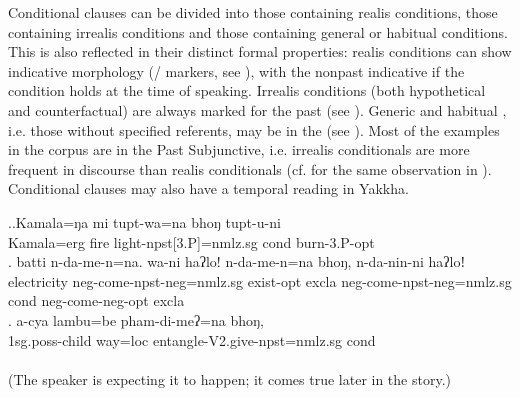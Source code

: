 Conditional clauses can be divided into those containing realis conditions, those containing irrealis conditions and those containing general or habitual conditions. This is also reflected in their  distinct formal properties: realis conditions can show indicative morphology (/ markers, see \Next), with the nonpast indicative if the condition holds at the time of speaking. Irrealis conditions (both hypothetical and counterfactual) are always marked for the past (see \NNext). Generic and habitual , i.e. those without specified referents, may be in the  (see \NNext[c]). Most of the examples in the  corpus are in the Past Subjunctive, i.e. irrealis conditionals are more frequent in discourse than realis conditionals (cf. \citet[463]{Genetti2007_Newari} for the same observation in ). Conditional clauses may also have a temporal reading in Yakkha. 


	\ex.\ag.Kamala=ŋa mi tupt-wa=na bhoŋ tupt-u-ni \\
	Kamala{\sc =erg} fire   light{\sc -npst[3.P]=nmlz.sg} {\sc cond} burn{\sc -3.P-opt}\\
	\bg.	batti n-da-me-n=na. wa-ni haʔlo! n-da-me-n=na bhoŋ, n-da-nin-ni haʔloǃ\\
	electricity   {\sc neg-}come{\sc [3sg]-npst-neg=nmlz.sg} exist{\sc [sbjv]-opt} {\sc excla} {\sc neg-}come{\sc [3sg]-npst-neg=nmlz.sg} {\sc cond} {\sc neg-}come{\sc [3sg]-neg-opt} {\sc excla} \\
\bg. a-cya            lambu=be    pham-di-meʔ=na bhoŋ,\\
{\sc 1sg.poss-}child way{\sc =loc} entangle{\sc -V2.give-npst=nmlz.sg} {\sc cond}\\
  \\
(The speaker is expecting it to happen; it comes true later in the story.)

